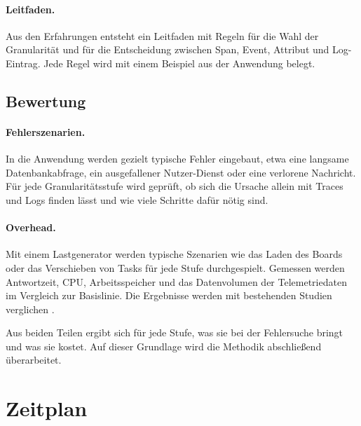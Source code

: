 \documentclass[11pt, a4paper]{article}
\begin{document}
\paragraph{Leitfaden.} Aus den Erfahrungen entsteht ein Leitfaden mit Regeln für die Wahl der Granularität und für die Entscheidung zwischen Span, Event, Attribut und Log-Eintrag. Jede Regel wird mit einem Beispiel aus der Anwendung belegt.

\subsection{Bewertung}

\paragraph{Fehlerszenarien.} In die Anwendung werden gezielt typische Fehler eingebaut, etwa eine langsame Datenbankabfrage, ein ausgefallener Nutzer-Dienst oder eine verlorene Nachricht. Für jede Granularitätsstufe wird geprüft, ob sich die Ursache allein mit Traces und Logs finden lässt und wie viele Schritte dafür nötig sind.

\paragraph{Overhead.} Mit einem Lastgenerator werden typische Szenarien wie das Laden des Boards oder das Verschieben von Tasks für jede Stufe durchgespielt. Gemessen werden Antwortzeit, CPU, Arbeitsspeicher und das Datenvolumen der Telemetriedaten im Vergleich zur Basislinie. Die Ergebnisse werden mit bestehenden Studien verglichen \cite{reichelt2023overhead}.

Aus beiden Teilen ergibt sich für jede Stufe, was sie bei der Fehlersuche bringt und was sie kostet. Auf dieser Grundlage wird die Methodik abschließend überarbeitet.

\section{Zeitplan}
\end{document}
